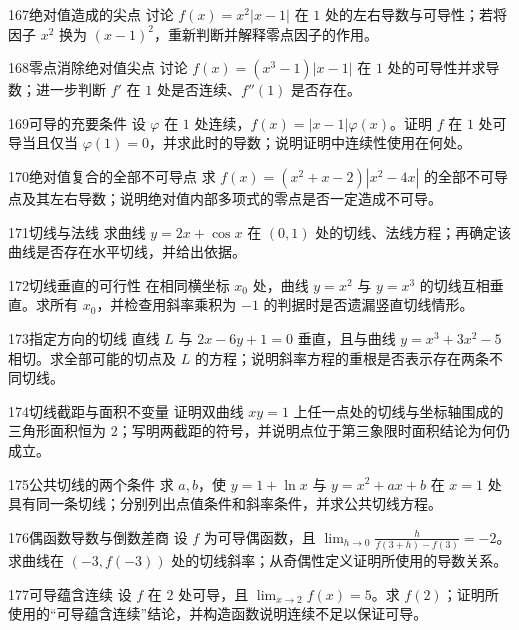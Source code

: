 \begin{exercise}{167}{绝对值造成的尖点}
讨论 $f(x)=x^2|x-1|$ 在 $1$ 处的左右导数与可导性；若将因子 $x^2$ 换为 $(x-1)^2$，重新判断并解释零点因子的作用。
\end{exercise}
\begin{exercise}{168}{零点消除绝对值尖点}
讨论 $f(x)=(x^3-1)|x-1|$ 在 $1$ 处的可导性并求导数；进一步判断 $f'$ 在 $1$ 处是否连续、$f''(1)$ 是否存在。
\end{exercise}
\begin{exercise}{169}{可导的充要条件}
设 $\varphi$ 在 $1$ 处连续，$f(x)=|x-1|\varphi(x)$。证明 $f$ 在 $1$ 处可导当且仅当 $\varphi(1)=0$，并求此时的导数；说明证明中连续性使用在何处。
\end{exercise}
\begin{exercise}{170}{绝对值复合的全部不可导点}
求 $f(x)=(x^2+x-2)|x^2-4x|$ 的全部不可导点及其左右导数；说明绝对值内部多项式的零点是否一定造成不可导。
\end{exercise}
\begin{exercise}{171}{切线与法线}
求曲线 $y=2x+\cos x$ 在 $(0,1)$ 处的切线、法线方程；再确定该曲线是否存在水平切线，并给出依据。
\end{exercise}
\begin{exercise}{172}{切线垂直的可行性}
在相同横坐标 $x_0$ 处，曲线 $y=x^2$ 与 $y=x^3$ 的切线互相垂直。求所有 $x_0$，并检查用斜率乘积为 $-1$ 的判据时是否遗漏竖直切线情形。
\end{exercise}
\begin{exercise}{173}{指定方向的切线}
直线 $L$ 与 $2x-6y+1=0$ 垂直，且与曲线 $y=x^3+3x^2-5$ 相切。求全部可能的切点及 $L$ 的方程；说明斜率方程的重根是否表示存在两条不同切线。
\end{exercise}
\begin{exercise}{174}{切线截距与面积不变量}
证明双曲线 $xy=1$ 上任一点处的切线与坐标轴围成的三角形面积恒为 $2$；写明两截距的符号，并说明点位于第三象限时面积结论为何仍成立。
\end{exercise}
\begin{exercise}{175}{公共切线的两个条件}
求 $a,b$，使 $y=1+\ln x$ 与 $y=x^2+ax+b$ 在 $x=1$ 处具有同一条切线；分别列出点值条件和斜率条件，并求公共切线方程。
\end{exercise}
\begin{exercise}{176}{偶函数导数与倒数差商}
设 $f$ 为可导偶函数，且 $\lim_{h\to0}\frac{h}{f(3+h)-f(3)}=-2$。求曲线在 $(-3,f(-3))$ 处的切线斜率；从奇偶性定义证明所使用的导数关系。
\end{exercise}
\begin{exercise}{177}{可导蕴含连续}
设 $f$ 在 $2$ 处可导，且 $\lim_{x\to2}f(x)=5$。求 $f(2)$；证明所使用的“可导蕴含连续”结论，并构造函数说明连续不足以保证可导。
\end{exercise}

